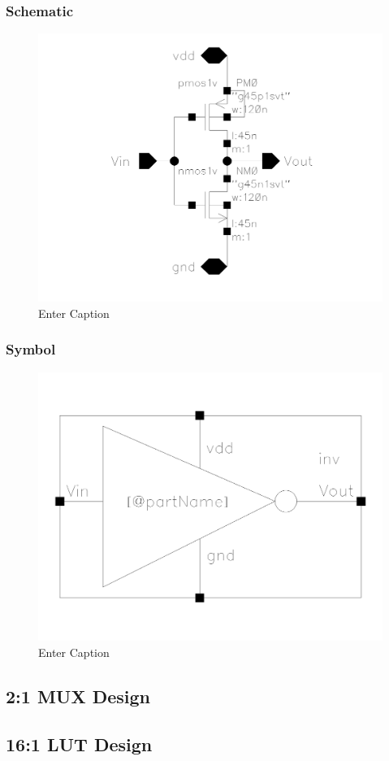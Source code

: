 \documentclass[12pt]{article}
\begin{document}
\subsubsection*{Schematic}
\begin{figure}[H]
    \centering
    \includegraphics[width=0.5\linewidth]{writeup//figures/inv_sch.png}
    \caption{Enter Caption}
\end{figure}


\subsubsection*{Symbol}
\begin{figure}[H]
    \centering
    \includegraphics[width=0.5\linewidth]{writeup//figures/inv_sym.png}
    \caption{Enter Caption}
\end{figure}


\newpage

\subsection{2:1 MUX Design}



\newpage

\subsection{16:1 LUT Design}



\newpage
\end{document}
